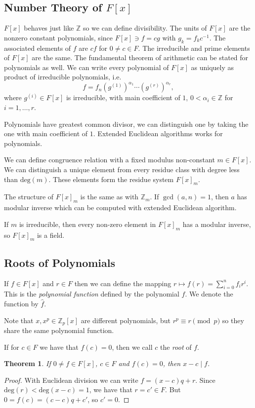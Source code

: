 \documentclass{article}
\newcommand{\Z}{\mathbb{Z}}
\newtheorem{theorem}{Theorem}
\begin{document}
\subsection{Number Theory of $F[x]$}

$F[x]$ behaves just like $\Z$ so we can define divisibility.
The units of $F[x]$ are the nonzero constant polynomials, since $F[x] \ni f = cg$ with $g_k = f_k c^{-1}$.
The associated elements of $f$ are $cf$ for $0 \neq c \in F$.
The irreducible and prime elements of $F[x]$ are the same. The fundamental theorem of arithmetic can be stated for polynomials as well.
We can write every polynomial of $F[x]$ as uniquely as product of irreducible polynomials, i.e. 
\[
    f = f_n\left(g^{(1)}\right)^{\alpha_1}\cdots \left(g^{(r)}\right)^{\alpha_r},
\]
where $g^{(i)} \in F[x]$ is irreducible, with main coefficient of $1$, $0 < \alpha_i \in \Z$ for $i=1,\ldots,r$.

Polynomials have greatest common divisor, we can distinguish one by taking the one with main coefficient of $1$.
Extended Euclidean algorithms works for polynomials.

We can define congruence relation with a fixed modulus non-constant $m \in F[x]$.
We can distinguish a unique element from every residue class with degree less than $\mathrm{deg}(m)$.
These elements form the residue system $F[x]_m$.

The structure of $F[x]_m$ is the same as with $\Z_m$.
If $\gcd(a,n)=1$, then $a$ has modular inverse which can be computed with extended Euclidean algorithm.

If $m$ is irreducible, then every non-zero element in $F[x]_m$ has a modular inverse, so $F[x]_m$ is a field.

\subsection{Roots of Polynomials}

If $f \in F[x]$ and $r \in F$ then we can define the mapping $r \mapsto f(r) = \sum_{i=0}^n f_i r^i$.
This is the \emph{polynomial function} defined by the polynomial $f$.
We denote the function by $\hat{f}$.

Note that $x, x^p \in \Z_p[x]$ are different polynomials, but $r^p \equiv r \pmod{p}$ so they share the same polynomial function.

If for $c \in F$ we have that $f(c) = 0$, then we call $c$ the \emph{root} of $f$.

\begin{theorem}
    If $0 \neq f \in F[x]$, $c \in F$ and $f(c) = 0$, then $x-c \mid f$.
\end{theorem}
\begin{proof}
    With Euclidean division we can write $f=(x-c)q + r$.
    Since $\mathrm{deg}(r) < \mathrm{deg}(x-c) = 1$, we have that $r=c' \in F$.
    But $0 = f(c) = (c-c)q + c'$, so $c'=0$.
\end{proof}
\end{document}
